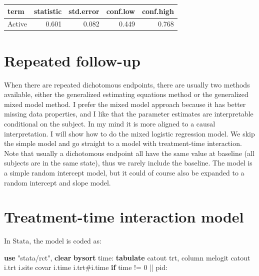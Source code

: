 \documentclass[
]{book}
\newenvironment{Shaded}{\begin{snugshade}}{\end{snugshade}}
\newcommand{\KeywordTok}[1]{\textcolor[rgb]{0.13,0.29,0.53}{\textbf{#1}}}
\newcommand{\NormalTok}[1]{#1}
\newcommand{\StringTok}[1]{\textcolor[rgb]{0.31,0.60,0.02}{#1}}
\begin{document}
\begin{tabular}{l|r|r|r|r}
\hline
term & statistic & std.error & conf.low & conf.high\\
\hline
Active & 0.601 & 0.082 & 0.449 & 0.768\\
\hline
\end{tabular}

\section{Repeated follow-up}\label{repeated-follow-up-1}

When there are repeated dichotomous endpoints, there are usually two methods available, either the generalized estimating equations method or the generalized mixed model method. I prefer the mixed model approach because it has better missing data properties, and I like that the parameter estimates are interpretable conditional on the subject. In my mind it is more aligned to a causal interpretation. I will show how to do the mixed logistic regression model. We skip the simple model and go straight to a model with treatment-time interaction. Note that usually a dichotomous endpoint all have the same value at baseline (all subjects are in the same state), thus we rarely include the baseline. The model is a simple random intercept model, but it could of course also be expanded to a random intercept and slope model.

\section{Treatment-time interaction model}\label{treatment-time-interaction-model}

In Stata, the model is coded as:

\begin{Shaded}
\begin{Highlighting}[]
\KeywordTok{use} \StringTok{"stata/rct"}\NormalTok{, }\KeywordTok{clear} 
\KeywordTok{bysort}\NormalTok{ time: }\KeywordTok{tabulate}\NormalTok{ catout trt, column}
\NormalTok{melogit catout i.trt i.site covar i.time i.trt\#i.time }\KeywordTok{if}\NormalTok{ time != 0 || pid: }
\end{Highlighting}
\end{Shaded}
\end{document}
